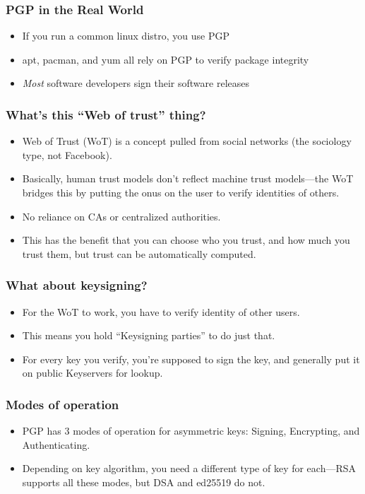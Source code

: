 \documentclass[aspectratio=1610,bigger,utf8]{beamer}
\begin{document}
\begin{frame}
	\frametitle{PGP in the Real World}
	\begin{itemize}
		\item If you run a common linux distro, you use PGP
		\item apt, pacman, and yum all rely on PGP to verify package
			integrity
		\item \emph{Most} software developers sign their software
			releases
	\end{itemize}
\end{frame}
\begin{frame}
	\frametitle{What's this ``Web of trust'' thing?}
	\begin{itemize}
		\item Web of Trust (WoT) is a concept pulled from social
			networks (the sociology type, not Facebook).
		\item Basically, human trust models don't reflect machine trust
			models---the WoT bridges this by putting the onus on
			the user to verify identities of others.
		\item No reliance on CAs or centralized authorities.
		\item This has the benefit that you can choose who you trust,
			and how much you trust them, but trust can be
			automatically computed.
	\end{itemize}
\end{frame}
\begin{frame}
	\frametitle{What about keysigning?}
	\begin{itemize}
		\item For the WoT to work, you have to verify identity of other
			users.
		\item This means you hold ``Keysigning parties'' to do just that.
		\item For every key you verify, you're supposed to sign the
			key, and generally put it on public \alert{Keyservers}
			for lookup.
	\end{itemize}
\end{frame}
\begin{frame}
	\frametitle{Modes of operation}
	\begin{itemize}
		\item PGP has 3 modes of operation for asymmetric keys: Signing,
			Encrypting, and Authenticating.
		\item Depending on key algorithm, you need a different type of
			key for each---RSA supports all these modes, but DSA
			and ed25519 do not.
	\end{itemize}
\end{frame}
\end{document}
